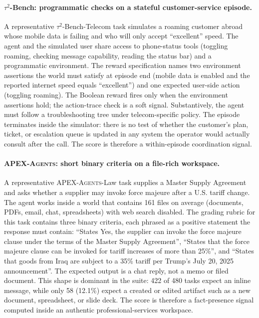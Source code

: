 \documentclass{article}
\begin{document}
\paragraph{$\tau^2$-Bench: programmatic checks on a stateful customer-service episode.}
A representative $\tau^2$-Bench-Telecom task simulates a roaming customer abroad whose mobile data is failing and who will only accept ``excellent'' speed.
The agent and the simulated user share access to phone-status tools (toggling roaming, checking message capability, reading the status bar) and a programmatic environment.
The reward specification names two environment assertions the world must satisfy at episode end (mobile data is enabled and the reported internet speed equals ``excellent'') and one expected user-side action (toggling roaming).
The Boolean reward fires only when the environment assertions hold; the action-trace check is a soft signal.
Substantively, the agent must follow a troubleshooting tree under telecom-specific policy.
The episode terminates inside the simulator: there is no test of whether the customer's plan, ticket, or escalation queue is updated in any system the operator would actually consult after the call.
The score is therefore a within-episode coordination signal.

\paragraph{\textsc{APEX-Agents}: short binary criteria on a file-rich workspace.}
A representative \textsc{APEX-Agents}-Law task supplies a Master Supply Agreement and asks whether a supplier may invoke force majeure after a U.S. tariff change.
The agent works inside a world that contains 161 files on average (documents, PDFs, email, chat, spreadsheets) with web search disabled.
The grading rubric for this task contains three binary criteria, each phrased as a positive statement the response must contain: ``States Yes, the supplier can invoke the force majeure clause under the terms of the Master Supply Agreement'', ``States that the force majeure clause can be invoked for tariff increases of more than 25\%'', and ``States that goods from Iraq are subject to a 35\% tariff per Trump's July 20, 2025 announcement''.
The expected output is a chat reply, not a memo or filed document.
This shape is dominant in the suite: 422 of 480 tasks expect an inline message, while only 58 (12.1\%) expect a created or edited artifact such as a new document, spreadsheet, or slide deck.
The score is therefore a fact-presence signal computed inside an authentic professional-services workspace.
\end{document}
